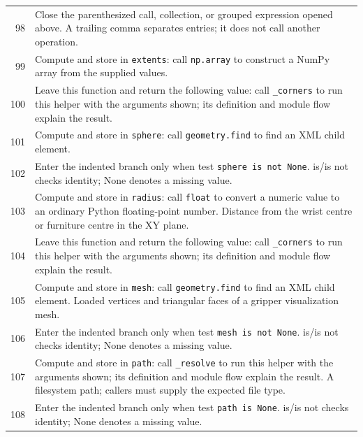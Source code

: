 \documentclass[11pt,a4paper]{book}
\begin{document}
\begin{longtable}{r p{}}
98 & Close the parenthesized call, collection, or grouped expression opened above. A trailing comma separates entries; it does not call another operation. \\

99 & Compute and store in \texttt{extents}: call \texttt{np.array} to construct a NumPy array from the supplied values.  \\

100 & Leave this function and return the following value: call \texttt{\_corners} to run this helper with the arguments shown; its definition and module flow explain the result. \\

101 & Compute and store in \texttt{sphere}: call \texttt{geometry.find} to find an XML child element.  \\

102 & Enter the indented branch only when test \texttt{sphere is not None}. is/is not checks identity; None denotes a missing value. \\

103 & Compute and store in \texttt{radius}: call \texttt{float} to convert a numeric value to an ordinary Python floating-point number. Distance from the wrist centre or furniture centre in the XY plane. \\

104 & Leave this function and return the following value: call \texttt{\_corners} to run this helper with the arguments shown; its definition and module flow explain the result. \\

105 & Compute and store in \texttt{mesh}: call \texttt{geometry.find} to find an XML child element. Loaded vertices and triangular faces of a gripper visualization mesh. \\

106 & Enter the indented branch only when test \texttt{mesh is not None}. is/is not checks identity; None denotes a missing value. \\

107 & Compute and store in \texttt{path}: call \texttt{\_resolve} to run this helper with the arguments shown; its definition and module flow explain the result. A filesystem path; callers must supply the expected file type. \\

108 & Enter the indented branch only when test \texttt{path is None}. is/is not checks identity; None denotes a missing value. \\


\end{longtable}
\end{document}
